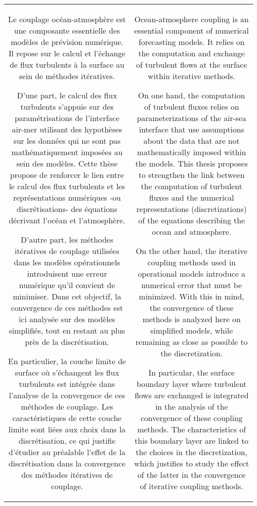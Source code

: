 \clearpage
{}
{}
\thispagestyle{empty}
\begin{tabular}{c|c}
{\begin{minipage}{15em}
Le couplage océan-atmosphère est une composante essentielle
des modèles de prévision numérique. Il repose sur
le calcul et l'échange de flux turbulents à la surface au
sein de méthodes itératives.
\par
D'une part, le calcul des flux turbulents s'appuie sur
des paramétrisations de l'interface air-mer utilisant
des hypothèses sur les données qui ne sont pas
mathématiquement imposées au sein des modèles.
Cette thèse propose de renforcer le lien entre
le calcul des flux turbulents et les
représentations numériques -ou discrétisations-
des équations décrivant l'océan et l'atmosphère.
\par
D'autre part, les méthodes itératives de couplage utilisées
dans les modèles opérationnels introduisent une erreur
numérique qu'il convient de minimiser. Dans cet
objectif, la convergence de ces méthodes est ici analysée
sur des modèles simplifiés, tout en restant au plus près
de la discrétisation.
\par
En particulier, la couche limite de surface où s'échangent
les flux turbulents est intégrée dans l'analyse de la
convergence de ces méthodes de couplage.
Les caractéristiques de cette couche limite sont liées
aux choix dans la discrétisation, ce qui justifie d'étudier
au préalable l'effet de la discrétisation
dans la convergence des méthodes itératives de couplage.
\end{minipage}}
&
{\begin{minipage}{15em}
Ocean-atmosphere coupling is an essential component of numerical forecasting models.
It relies on the computation and exchange of turbulent flows at the surface within iterative methods.  
\par
On one hand, the computation of turbulent fluxes relies
on parameterizations of the air-sea interface that use
assumptions about the data that are not
mathematically imposed within the models.
This thesis proposes to strengthen the link between the computation
of turbulent fluxes and the numerical representations
(discretizations) of the equations describing the ocean and
atmosphere.
\par
On the other hand, the iterative coupling methods used
in operational models introduce a numerical error that
must be minimized. With this in mind, the convergence of
these methods is analyzed
here on simplified models, while remaining as close
as possible to the discretization.
\par
In particular, the surface boundary layer where turbulent flows
are exchanged is integrated in the
analysis of the convergence of these coupling methods.
The characteristics of this boundary layer are linked to
the choices in the discretization, which justifies to study
the effect of the latter in the convergence of iterative
coupling methods.
\end{minipage}}
\end{tabular}
